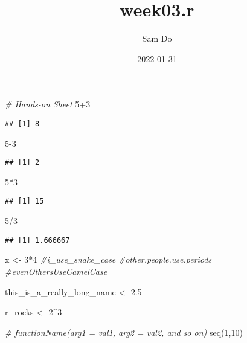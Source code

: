 \documentclass[
]{article}
\title{week03.r}
\author{Sam Do}
\date{2022-01-31}
\newenvironment{Shaded}{\begin{snugshade}}{\end{snugshade}}
\newcommand{\CommentTok}[1]{\textcolor[rgb]{0.56,0.35,0.01}{\textit{#1}}}
\newcommand{\DecValTok}[1]{\textcolor[rgb]{0.00,0.00,0.81}{#1}}
\newcommand{\FloatTok}[1]{\textcolor[rgb]{0.00,0.00,0.81}{#1}}
\newcommand{\FunctionTok}[1]{\textcolor[rgb]{0.00,0.00,0.00}{#1}}
\newcommand{\NormalTok}[1]{#1}
\newcommand{\OtherTok}[1]{\textcolor[rgb]{0.56,0.35,0.01}{#1}}
\newcommand{\SpecialCharTok}[1]{\textcolor[rgb]{0.00,0.00,0.00}{#1}}
\begin{document}
\maketitle

\begin{Shaded}
\begin{Highlighting}[]
\CommentTok{\# Hands{-}on Sheet}
\DecValTok{5}\SpecialCharTok{+}\DecValTok{3}
\end{Highlighting}
\end{Shaded}

\begin{verbatim}
## [1] 8
\end{verbatim}

\begin{Shaded}
\begin{Highlighting}[]
\DecValTok{5{-}3}
\end{Highlighting}
\end{Shaded}

\begin{verbatim}
## [1] 2
\end{verbatim}

\begin{Shaded}
\begin{Highlighting}[]
\DecValTok{5}\SpecialCharTok{*}\DecValTok{3}
\end{Highlighting}
\end{Shaded}

\begin{verbatim}
## [1] 15
\end{verbatim}

\begin{Shaded}
\begin{Highlighting}[]
\DecValTok{5}\SpecialCharTok{/}\DecValTok{3}
\end{Highlighting}
\end{Shaded}

\begin{verbatim}
## [1] 1.666667
\end{verbatim}

\begin{Shaded}
\begin{Highlighting}[]
\NormalTok{x }\OtherTok{\textless{}{-}} \DecValTok{3}\SpecialCharTok{*}\DecValTok{4}
\CommentTok{\#i\_use\_snake\_case}
\CommentTok{\#other.people.use.periods}
\CommentTok{\#evenOthersUseCamelCase}

\NormalTok{this\_is\_a\_really\_long\_name }\OtherTok{\textless{}{-}}  \FloatTok{2.5}

\NormalTok{r\_rocks }\OtherTok{\textless{}{-}} \DecValTok{2}\SpecialCharTok{\^{}}\DecValTok{3}

\CommentTok{\# functionName(arg1 = val1, arg2 = val2, and so on)}
\FunctionTok{seq}\NormalTok{(}\DecValTok{1}\NormalTok{,}\DecValTok{10}\NormalTok{)}
\end{Highlighting}
\end{Shaded}
\end{document}
